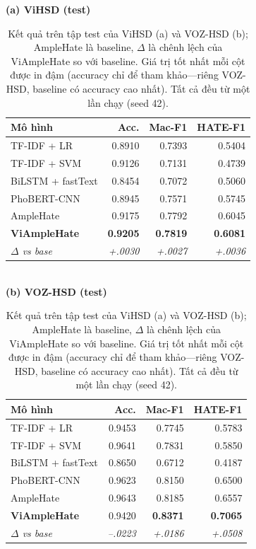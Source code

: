 \documentclass[11pt]{article}
\begin{document}
\begin{table}[tbp]
  \centering
  \small
  \setlength{\tabcolsep}{4pt}
  \textbf{(a) ViHSD (test)}\\[2pt]
  \begin{tabular}{lrrr}
    \toprule
    \textbf{Mô hình} & \textbf{Acc.} & \textbf{Mac-F1} & \textbf{HATE-F1} \\
    \midrule
    TF-IDF + LR          & 0.8910 & 0.7393 & 0.5404 \\
    TF-IDF + SVM         & 0.9126 & 0.7131 & 0.4739 \\
    BiLSTM + fastText    & 0.8454 & 0.7072 & 0.5060 \\
    PhoBERT-CNN          & 0.8945 & 0.7571 & 0.5745 \\
    AmpleHate            & 0.9175 & 0.7792 & 0.6045 \\
    \textbf{ViAmpleHate} & \textbf{0.9205} & \textbf{0.7819} & \textbf{0.6081} \\
    \textit{$\Delta$ vs base} & \textit{+.0030} & \textit{+.0027} & \textit{+.0036} \\
    \bottomrule
  \end{tabular}\\[6pt]
  \textbf{(b) VOZ-HSD (test)}\\[2pt]
  \begin{tabular}{lrrr}
    \toprule
    \textbf{Mô hình} & \textbf{Acc.} & \textbf{Mac-F1} & \textbf{HATE-F1} \\
    \midrule
    TF-IDF + LR          & 0.9453 & 0.7745 & 0.5783 \\
    TF-IDF + SVM         & 0.9641 & 0.7831 & 0.5850 \\
    BiLSTM + fastText    & 0.8650 & 0.6712 & 0.4187 \\
    PhoBERT-CNN          & 0.9623 & 0.8150 & 0.6500 \\
    AmpleHate            & 0.9643 & 0.8185 & 0.6557 \\
    \textbf{ViAmpleHate} & 0.9420 & \textbf{0.8371} & \textbf{0.7065} \\
    \textit{$\Delta$ vs base} & \textit{--.0223} & \textit{+.0186} & \textit{+.0508} \\
    \bottomrule
  \end{tabular}
  \caption{Kết quả trên tập test của ViHSD (a) và VOZ-HSD (b); AmpleHate là baseline, $\Delta$ là chênh lệch của ViAmpleHate so với baseline. Giá trị tốt nhất mỗi cột được in đậm (accuracy chỉ để tham khảo---riêng VOZ-HSD, baseline có accuracy cao nhất). Tất cả đều từ một lần chạy (seed 42).}
  \label{tab:main}
\end{table}
\end{document}
